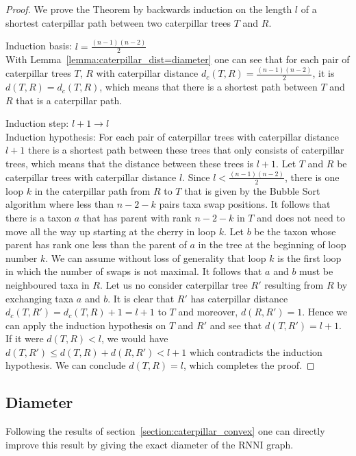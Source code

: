 \documentclass{amsart}
\newcommand{\rnni}{\mathrm{RNNI}}
\begin{document}
\begin{proof}
    We prove the Theorem by backwards induction on the length $l$ of a shortest caterpillar path between two caterpillar trees $T$ and $R$.

    Induction basis: $l = \frac{(n-1)(n-2)}{2}$\\
    With Lemma~\ref{lemma:caterpillar_dist=diameter} one can see that for each pair of caterpillar trees $T$, $R$ with caterpillar distance $d_c(T,R) = \frac{(n-1)(n-2)}{2}$, it is $d(T,R) = d_c(T,R)$, which means that there is a shortest path between $T$ and $R$ that is a caterpillar path.

    Induction step: $l+1 \to l$\\
    Induction hypothesis: For each pair of caterpillar trees with caterpillar distance $l+1$ there is a shortest path between these trees that only consists of caterpillar trees, which means that the distance between these trees is $l+1$.
    Let $T$ and $R$ be caterpillar trees with caterpillar distance $l$.
    Since $l < \frac{(n-1)(n-2)}{2}$, there is one loop $k$ in the caterpillar path from $R$ to $T$ that is given by the Bubble Sort algorithm  where less than $n-2-k$ pairs taxa swap positions.
    It follows that there is a taxon $a$ that has parent with rank $n-2-k$ in $T$ and does not need to move all the way up starting at the cherry in loop $k$.
    Let $b$ be the taxon whose parent has rank one less than the parent of $a$ in the tree at the beginning of loop number $k$.
    We can assume without loss of generality that loop $k$ is the first loop in which the number of swaps is not maximal.
    It follows that $a$ and $b$ must be neighboured taxa in $R$.
    Let us no consider caterpillar tree $R'$ resulting from $R$ by exchanging taxa $a$ and $b$.
    It is clear that $R'$ has caterpillar distance $d_c(T,R') = d_c(T,R) + 1 = l+1$ to $T$ and moreover, $d(R,R') = 1$.
    Hence we can apply the induction hypothesis on $T$ and $R'$ and see that $d(T,R') = l+1$.
    If it were $d(T,R) < l$, we would have $d(T,R') \leq d(T,R) + d(R,R') < l + 1$ which contradicts the induction hypothesis.
    We can conclude $d(T,R) = l$, which completes the proof.
\end{proof}


\subsection{Diameter}

Following the results of section~\ref{section:caterpillar_convex} one can directly improve this result by giving the exact diameter of the $\rnni$ graph.
\end{document}
